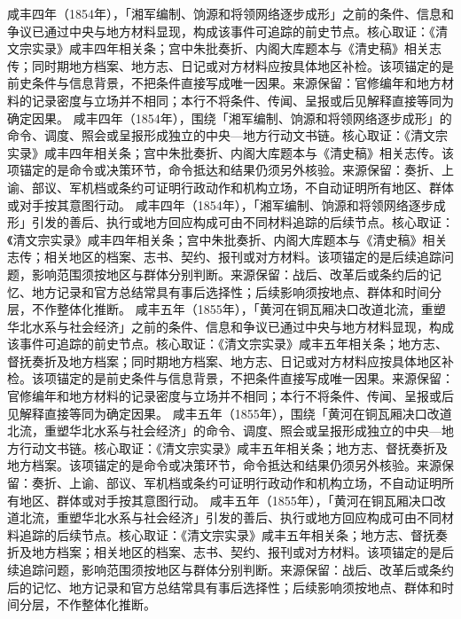 咸丰四年（1854年），「湘军编制、饷源和将领网络逐步成形」之前的条件、信息和争议已通过中央与地方材料显现，构成该事件可追踪的前史节点。核心取证：《清文宗实录》咸丰四年相关条；宫中朱批奏折、内阁大库题本与《清史稿》相关志传；同时期地方档案、地方志、日记或对方材料应按具体地区补检。该项锚定的是前史条件与信息背景，不把条件直接写成唯一因果。来源保留：官修编年和地方材料的记录密度与立场并不相同；本行不将条件、传闻、呈报或后见解释直接等同为确定因果。
咸丰四年（1854年），围绕「湘军编制、饷源和将领网络逐步成形」的命令、调度、照会或呈报形成独立的中央—地方行动文书链。核心取证：《清文宗实录》咸丰四年相关条；宫中朱批奏折、内阁大库题本与《清史稿》相关志传。该项锚定的是命令或决策环节，命令抵达和结果仍须另外核验。来源保留：奏折、上谕、部议、军机档或条约可证明行政动作和机构立场，不自动证明所有地区、群体或对手按其意图行动。
咸丰四年（1854年），「湘军编制、饷源和将领网络逐步成形」引发的善后、执行或地方回应构成可由不同材料追踪的后续节点。核心取证：《清文宗实录》咸丰四年相关条；宫中朱批奏折、内阁大库题本与《清史稿》相关志传；相关地区的档案、志书、契约、报刊或对方材料。该项锚定的是后续追踪问题，影响范围须按地区与群体分别判断。来源保留：战后、改革后或条约后的记忆、地方记录和官方总结常具有事后选择性；后续影响须按地点、群体和时间分层，不作整体化推断。
咸丰五年（1855年），「黄河在铜瓦厢决口改道北流，重塑华北水系与社会经济」之前的条件、信息和争议已通过中央与地方材料显现，构成该事件可追踪的前史节点。核心取证：《清文宗实录》咸丰五年相关条；地方志、督抚奏折及地方档案；同时期地方档案、地方志、日记或对方材料应按具体地区补检。该项锚定的是前史条件与信息背景，不把条件直接写成唯一因果。来源保留：官修编年和地方材料的记录密度与立场并不相同；本行不将条件、传闻、呈报或后见解释直接等同为确定因果。
咸丰五年（1855年），围绕「黄河在铜瓦厢决口改道北流，重塑华北水系与社会经济」的命令、调度、照会或呈报形成独立的中央—地方行动文书链。核心取证：《清文宗实录》咸丰五年相关条；地方志、督抚奏折及地方档案。该项锚定的是命令或决策环节，命令抵达和结果仍须另外核验。来源保留：奏折、上谕、部议、军机档或条约可证明行政动作和机构立场，不自动证明所有地区、群体或对手按其意图行动。
咸丰五年（1855年），「黄河在铜瓦厢决口改道北流，重塑华北水系与社会经济」引发的善后、执行或地方回应构成可由不同材料追踪的后续节点。核心取证：《清文宗实录》咸丰五年相关条；地方志、督抚奏折及地方档案；相关地区的档案、志书、契约、报刊或对方材料。该项锚定的是后续追踪问题，影响范围须按地区与群体分别判断。来源保留：战后、改革后或条约后的记忆、地方记录和官方总结常具有事后选择性；后续影响须按地点、群体和时间分层，不作整体化推断。
